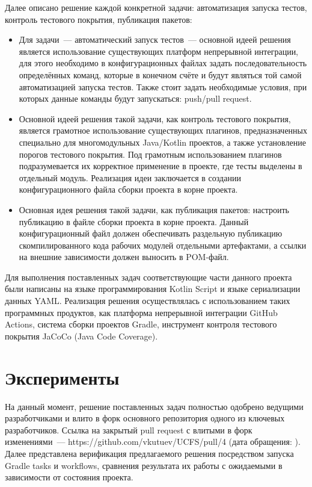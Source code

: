 \documentclass[a4paper]{article}
\begin{document}
Далее описано решение каждой конкретной задачи: автоматизация запуска тестов, контроль тестового покрытия, публикация пакетов:
\begin{itemize}
    \item Для задачи~--- автоматический запуск тестов~--- основной идеей решения является использование существующих платформ непрерывной интеграции, для этого необходимо в конфигурационных файлах задать последовательность определённых команд, которые в конечном счёте и будут являться той самой автоматизацией запуска тестов. Также стоит задать необходимые условия, при которых данные команды будут запускаться: push/pull request.
    \item Основной идеей решения такой задачи, как контроль тестового покрытия, является грамотное использование существующих плагинов, предназначенных специально для многомодульных Java/Kotlin проектов, а также установление порогов тестового покрытия. Под грамотным использованием плагинов подразумевается их корректное применение в проекте, где тесты выделены в отдельный модуль. Реализация идеи заключается в создании конфигурационного файла сборки проекта в корне проекта.
    \item Основная идея решения такой задачи, как публикация пакетов: настроить публикацию в файле сборки проекта в корне проекта. Данный конфигурационный файл должен обеспечивать раздельную публикацию скомпилированного кода рабочих модулей отдельными артефактами, а ссылки на внешние зависимости должен выносить в POM-файл.
\end{itemize}

Для выполнения поставленных задач соответствующие части данного проекта были написаны на языке программирования Kotlin Script и языке сериализации данных YAML.
Реализация решения осуществлялась с использованием таких программных продуктов, как платформа непрерывной интеграции GitHub Actions, система сборки проектов Gradle, инструмент контроля тестового покрытия JaCoCo (Java Code Coverage).

\section{Эксперименты}
На данный момент, решение поставленных задач полностью одобрено ведущими разработчиками и влито в форк основного репозитория одного из ключевых разработчиков. Ссылка на закрытый pull request с влитыми в форк изменениями~--- https://github.com/vkutuev/UCFS/pull/4 (дата обращения: ). Далее представлена верификация предлагаемого решения посредством запуска Gradle tasks и workflows, сравнения результата их работы с ожидаемыми в зависимости от состояния проекта.
\end{document}

